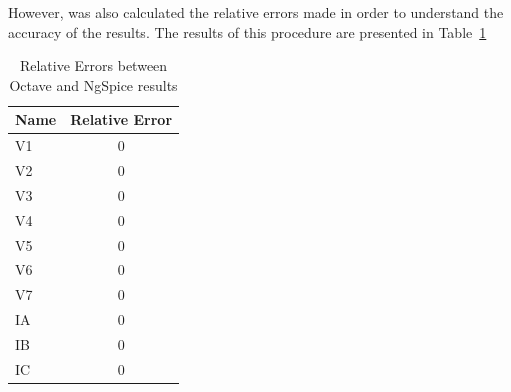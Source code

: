 However, was also calculated the relative errors made in order to understand the accuracy of the results. The results of this procedure are presented in Table~\ref{tab:erros}

\begin{table}[ht] \centering
\begin{tabular}{|l|c|}
\hline
{\bf Name} & {\bf Relative Error} \\ \hline
{V1}               & 0               \\ \hline
{V2}               & 0               \\ \hline
{V3}               & 0               \\ \hline
{V4}               & 0               \\ \hline
{V5}               & 0                       \\ \hline
{V6}               & 0                       \\ \hline
{V7}               & 0               \\ \hline
{IA}               & 0               \\ \hline
{IB}               & 0               \\ \hline
{IC}               & 0                       \\ \hline
\end{tabular}
\caption{Relative Errors between Octave and NgSpice results}
  \label{tab:erros}
\end{table}



